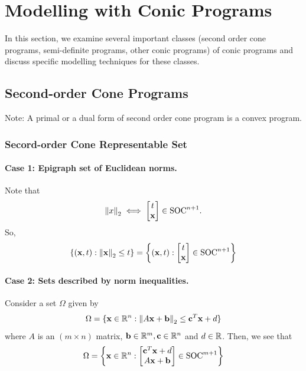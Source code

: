 \section{Modelling with Conic Programs}

In this section, we examine several important classes (second order cone programs, semi-definite programs, other conic programs) of conic programs and discuss specific modelling techniques for these classes.

\subsection{Second-order Cone Programs}

Note: A primal or a dual form of second order cone program is a convex program.

\subsubsection{Secord-order Cone Representable Set}

\paragraph{Case 1: Epigraph set of Euclidean norms.} Note that
\[\norm{x}_2 \iff \begin{bmatrix}
        t \\ \mathbf{x}
    \end{bmatrix} \in \text{SOC}^{n + 1}.\]
So,
\[\{(\mathbf{x}, t) : \norm{\mathbf{x}}_2 \leq t\} = \left\{(\mathbf{x}, t) : \begin{bmatrix}
        t \\ \mathbf{x}
    \end{bmatrix} \in \text{SOC}^{n + 1}\right\}\]

\paragraph{Case 2: Sets described by norm inequalities.} Consider a set \(\Omega\) given by
\[\Omega = \{\mathbf{x} \in \mathbb{R}^n : \norm{A\mathbf{x} + \mathbf{b}}_2 \leq \mathbf{c}^T\mathbf{x}+ d\}\]
where \(A\) is an \((m \times n)\) matrix, \(\mathbf{b} \in \mathbb{R}^m, \mathbf{c} \in \mathbb{R}^n\) and \(d \in \mathbb{R}\). Then, we see that
\[
    \Omega = \left\{\mathbf{x} \in \mathbb{R}^n : \begin{bmatrix}
        \mathbf{c}^T\mathbf{x} + d \\ A\mathbf{x} + \mathbf{b}
    \end{bmatrix} \in \operatorname{SOC}^{m + 1}\right\}
\]

